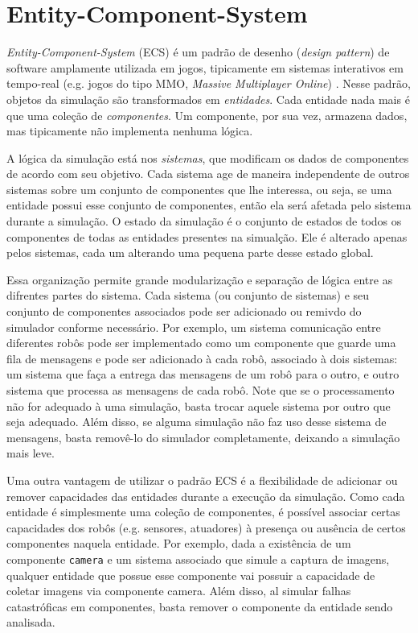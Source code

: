 \section{Entity-Component-System}
\label{sec:ECS}

\textit{Entity-Component-System} (ECS) é um padrão de desenho (\textit{design pattern}) de software amplamente utilizada em jogos, tipicamente em sistemas interativos em tempo-real (e.g. jogos do tipo MMO, \textit{Massive Multiplayer Online}) \cite{wiebusch2015decoupling}. Nesse padrão, objetos da simulação são transformados em \textit{entidades}. Cada entidade nada mais é que uma coleção de \textit{componentes}. Um componente, por sua vez, armazena dados, mas tipicamente não implementa nenhuma lógica.

A lógica da simulação está nos \textit{sistemas}, que modificam os dados de componentes de acordo com seu objetivo. Cada sistema age de maneira independente de outros sistemas sobre um conjunto de componentes que lhe interessa, ou seja, se uma entidade possui esse conjunto de componentes, então ela será afetada pelo sistema durante a simulação. O estado da simulação é o conjunto de estados de todos os componentes de todas as entidades presentes na simualção. Ele é alterado apenas pelos sistemas, cada um alterando uma pequena parte desse estado global.

Essa organização permite grande modularização e separação de lógica entre as difrentes partes do sistema. Cada sistema (ou conjunto de sistemas) e seu conjunto de componentes associados pode ser adicionado ou remivdo do simulador conforme necessário. Por exemplo, um sistema comunicação entre diferentes robôs pode ser implementado como um componente que guarde uma fila de mensagens e pode ser adicionado à cada robô, associado à dois sistemas: um sistema que faça a entrega das mensagens de um robô para o outro, e outro sistema que processa as mensagens de cada robô. Note que se o processamento não for adequado à uma simulação, basta trocar aquele sistema por outro que seja adequado. Além disso, se alguma simulação não faz uso desse sistema de mensagens, basta removê-lo do simulador completamente, deixando a simulação mais leve.

Uma outra vantagem de utilizar o padrão ECS é a flexibilidade de adicionar ou remover capacidades das entidades durante a execução da simulação. Como cada entidade é simplesmente uma coleção de componentes, é possível associar certas capacidades dos robôs (e.g. sensores, atuadores) à presença ou ausência de certos componentes naquela entidade. Por exemplo, dada a existência de um componente \texttt{camera} e um sistema associado que simule a captura de imagens, qualquer entidade que possue esse componente vai possuir a capacidade de coletar imagens via componente camera. Além disso, al simular falhas catastróficas em componentes, basta remover o componente da entidade sendo analisada.


